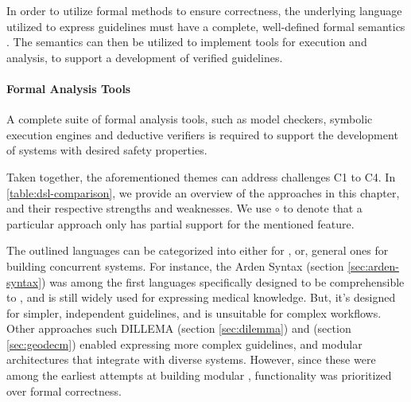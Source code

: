 In order to utilize formal methods to ensure \CDSS{} correctness,
the underlying language utilized to express guidelines must have
a complete, well-defined formal semantics \cite{ShaharAMIA96}. The
semantics can then be utilized to implement tools for execution and analysis,
to support a development of verified guidelines.

\paragraph{Formal Analysis Tools}

A complete suite of formal analysis tools, such as model checkers, symbolic
execution engines and deductive verifiers is required to support the
development of systems with desired safety properties.

Taken together, the aforementioned themes can address challenges C1 to C4.
In \tablename{} \ref{table:dsl-comparison}, we provide an overview of
the approaches in this chapter, and their respective strengths and weaknesses.
We use $\circ$ to denote that a particular approach only has partial support
for the mentioned feature.

The outlined languages can be categorized into either \DSLs{} for \CIGs{},
or, general ones for building concurrent systems. For instance,
the Arden Syntax (section \ref{sec:arden-syntax})
was among the first languages specifically designed to be
comprehensible to \HCPs{}, and is still widely used for expressing medical
knowledge. But, it's designed for simpler, independent guidelines, and
is unsuitable for complex workflows. Other approaches
such DILLEMA (section \ref{sec:dilemma}) and \GEODECM{}
(section \ref{sec:geodecm}) enabled expressing more complex guidelines,
and modular architectures that integrate with diverse systems.
However, since these were among the earliest attempts at building modular \CDSSs{},
functionality was prioritized over formal correctness.

